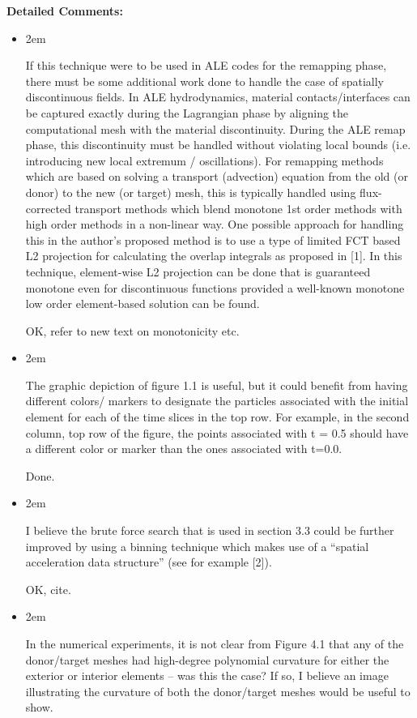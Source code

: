\documentclass{letter}
\renewcommand{\rq}[1]{\begin{addmargin}[2em]{2em}
\it
#1
\end{addmargin}\vspace{12pt}}
\begin{document}
\begin{letter}{}
\begin{itemize}
\end{itemize}

\textbf{Detailed Comments:}

\begin{itemize} \renewcommand\labelitemi{--}

\item \rq{
If this technique were to be used in ALE codes for the remapping phase, there must be some additional work done to handle the case of spatially discontinuous fields. In ALE hydrodynamics, material contacts/interfaces can be captured exactly during the Lagrangian phase by aligning the computational mesh with the material discontinuity. During the ALE remap phase, this discontinuity must be handled without violating local bounds (i.e. introducing new local extremum / oscillations). For remapping methods which are based on solving a transport (advection) equation from the old (or donor) to the new (or target) mesh, this is typically handled using flux-corrected transport methods which blend monotone 1st order methods with high order methods in a non-linear way. One possible approach for handling this in the author’s proposed method is to use a type of limited FCT based L2 projection for calculating the overlap integrals as proposed in [1]. In this technique, element-wise L2 projection can be done that is guaranteed monotone even for discontinuous functions provided a well-known monotone low order element-based solution can be found. }

OK, refer to new text on monotonicity etc.
  
\item \rq{
The graphic depiction of figure 1.1 is useful, but it could benefit from having different colors/ markers to designate the particles associated with the initial element for each of the time slices in the top row. For example, in the second column, top row of the figure, the points associated with t = 0.5 should have a different color or marker than the ones associated with t=0.0.}

Done.
  
\item \rq{
I believe the brute force search that is used in section 3.3 could be further improved by using a binning technique which makes use of a “spatial acceleration data structure” (see for example [2]).}

OK, cite.
  
\item \rq{
  In the numerical experiments, it is not clear from Figure 4.1 that any of the donor/target meshes had high-degree polynomial curvature for either the exterior or interior elements – was this the case? If so, I believe an image illustrating the curvature of both the donor/target meshes would be useful to show.}


\end{itemize}
\end{letter}
\end{document}
